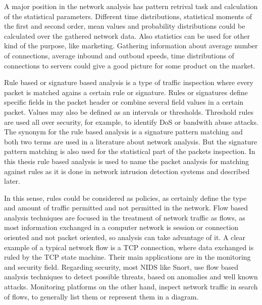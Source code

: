 \documentclass[thesis=M,english]{FITthesis}[2011/07/15]
\begin{document}
A major position in the network analysis has pattern retrival task and calculation of the statistical parameters. Different time distributions, statistical moments of the first and second order, mean values and probability distributions could be calculated over the gathered network data. Also statistics can be used for other kind of the purpose, like marketing. Gathering information about average number of connections, average inbound and outboud speeds, time distributions of connections to servers could give a good picture for some product on the market.

Rule based or signature based analysis is a type of traffic inspection where every packet is matched agains a certain rule or signature. Rules or signatures define specific fields in the packet header or combine several field values in a certain packet. Values may also be defined as an intervals or thresholds. Threshold rules are used all over security, for example, to identify DoS or bandwith abuse attacks. The synonym for the rule based analysis is a signature pattern matching and both two terms are used in a literature about network analysis. But the signature pattern matching is also used for the statistical part of the packets inspection. In this thesis rule based analysis is used to name the packet analysis for matching against rules as it is done in network intrusion detection systems and described later. 

In this sense, rules could be considered as policies, as certainly define the type and amount of traffic permitted and not permitted in the network. Flow based analysis techniques are focused in the treatment of network traffic as flows, as most information exchanged in a computer network is session or connection oriented and not packet oriented, so analysis can take advantage of it. A clear example of a typical network flow is a TCP connection, where data exchanged is ruled by the TCP state machine.
Their main applications are in the monitoring and security field. Regarding security, most NIDS like Snort, use flow based analysis techniques to detect possible threats, based on anomalies and well known attacks. Monitoring platforms on the other hand, inspect network traffic in search of flows, to generally list them or represent them in a diagram.
\end{document}

